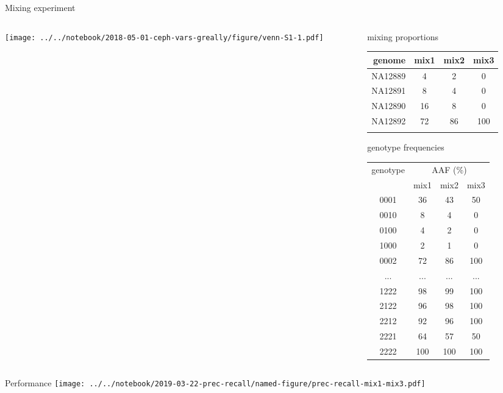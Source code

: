 \documentclass{beamer}
\begin{document}
\begin{frame}{Mixing experiment}
\begin{columns}[t]
\begin{column}{0.5\textwidth}

\texttt{[image: ../../notebook/2018-05-01-ceph-vars-greally/figure/venn-S1-1.pdf]}
\end{column}

\begin{column}{0.5\textwidth}

{\tiny
{\large mixing proportions}

\begin{tabular}{r|ccc}
genome & mix1 & mix2 & mix3 \\
\hline
NA12889 & 4 & 2 & 0 \\
NA12891 & 8 & 4 & 0 \\
NA12890 & 16 & 8 & 0 \\
NA12892 & 72 & 86 & 100 \\
& & & \\
\end{tabular}
\vfill
{\large genotype frequencies}

\begin{tabular}{c|ccc}
genotype & \multicolumn{3}{c}{AAF (\%)} \\
& mix1 &  mix2 & mix3 \\
\hline
0001 & 36 & 43 & 50\\
0010 & 8 & 4 & 0\\
0100 & 4 & 2 & 0\\
1000 & 2 & 1 & 0\\
0002 & 72 & 86 & 100\\
... & ... & ... & ...\\
1222 & 98 & 99 & 100\\
2122 & 96 & 98 & 100\\
2212 & 92 & 96 & 100\\
2221 & 64 & 57 & 50\\
2222 & 100 & 100 & 100\\
\end{tabular}
}
\end{column}
\end{columns}
\end{frame}

\begin{frame}{Performance}
\texttt{[image: ../../notebook/2019-03-22-prec-recall/named-figure/prec-recall-mix1-mix3.pdf]}
\end{frame}
\end{document}
